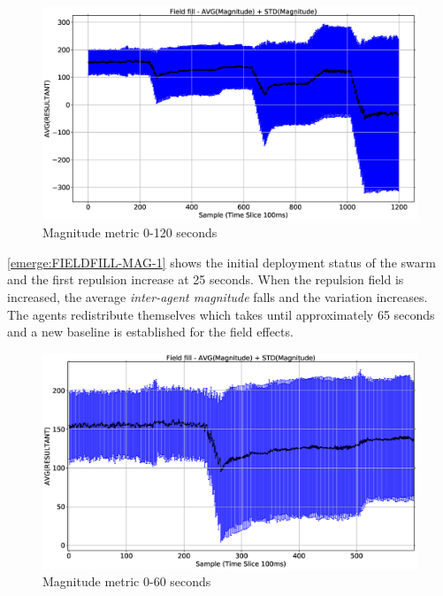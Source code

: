 \begin{figure}[H]
\begin{center}
\includegraphics[width=12cm]{CHAPTER-8/figures/FIELDFILL-MAG}
\end{center}
\caption{Magnitude metric 0-120 seconds\label{emerge:FIELDFILL-MAG}}
\end{figure}

\autoref{emerge:FIELDFILL-MAG-1} shows the initial deployment status of the swarm and the first repulsion increase at 25 seconds. When the repulsion field is increased, the average \textit{inter-agent magnitude} falls and the variation increases. The agents redistribute themselves which takes until approximately 65 seconds and a new baseline is established for the field effects.

\begin{figure}[H]
\begin{center}
\includegraphics[width=12cm]{CHAPTER-8/figures/FIELDFILL-MAG-1}
\end{center}
\caption{Magnitude metric 0-60 seconds\label{emerge:FIELDFILL-MAG-1}}
\end{figure}

